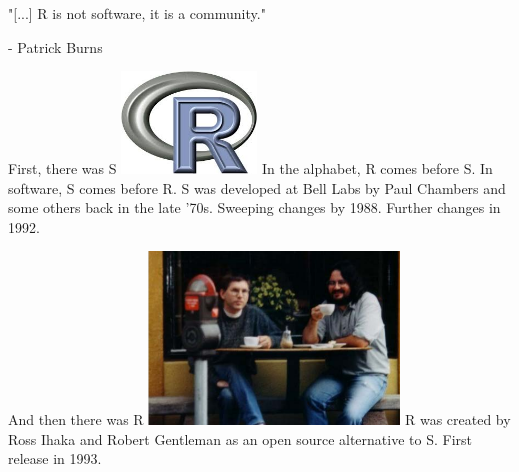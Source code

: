 \documentclass[xcolor=dvipsnames]{beamer}
\begin{document}
\begin{frame}
  "[...] R is not software, it is a community."
  
  - Patrick Burns
\end{frame}

\begin{frame}{First, there was S}
  \includegraphics[width=0.27\textwidth]{../Part1/figure/R}
  \newline
  In the alphabet, R comes before S. In software, S comes before R.
  \newline
  \newline
  S was developed at Bell Labs by Paul Chambers and some others back in the late '70s. Sweeping changes by 1988. Further changes in 1992.
\end{frame}

\begin{frame}{And then there was R}
  \includegraphics[width=0.5\textwidth]{../Part1/figure/RossAndRobert}
  \newline
  R was created by Ross Ihaka and Robert Gentleman as an open source alternative to S. First release in 1993.
\end{frame}
\end{document}
